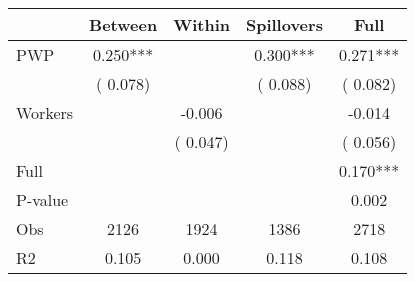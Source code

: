 
\begin{tabular}{l*{4}{c}}\hline&\multicolumn{1}{c}{Between}&\multicolumn{1}{c}{Within}&\multicolumn{1}{c}{Spillovers}&\multicolumn{1}{c}{Full}\\ \hline
 PWP           &              0.250***      &                                               &        0.300*** &         0.271***                            \\ 
                               &        (       0.078)           &                                       &       (       0.088)     &      (       0.082)                                           \\ 
 Workers       &                                               &       -0.006    &                                &            -0.014                            \\ 
                               &                                               & (       0.047)                  &                                        &      (       0.056)                                           \\ 
\hline                                                                                                                                                                                                                                            
 Full                  &                                               &                                               &                                        &             0.170***                                     \\ 
 P-value               &                                               &                                               &                                        &             0.002                                           \\ 
 Obs                   &               2126               &       1924                       &       1386                &              2718                                               \\ 
 R2                    &                      0.105              &              0.000                      &              0.118               &                     0.108                                              \\ 
\hline \end{tabular}                                                                                                                                                                                                              